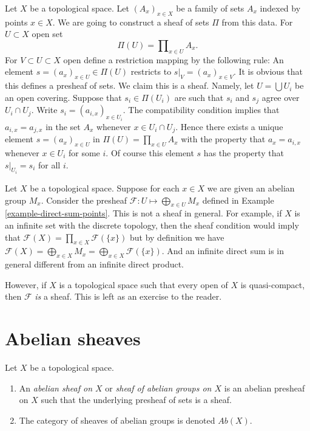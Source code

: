\begin{example}
\label{example-sheaf-product-pointwise}
Let $X$ be a topological space. Let $(A_x)_{x \in X}$ be 
a family of sets $A_x$ indexed by points $x \in X$. We are
going to construct a sheaf of sets $\Pi$ from this data.
For $U \subset X$ open set
$$
\Pi(U) = \prod\nolimits_{x \in U} A_x.
$$
For $V \subset U \subset X$ open define
a restriction mapping by the following rule: An element
$s = (a_x)_{x\in U} \in \Pi(U)$ restricts
to $s|_V = (a_x)_{x \in V}$. It is obvious that this
defines a presheaf of sets. We claim this is a sheaf.
Namely, let $U = \bigcup U_i$ be an open covering.
Suppose that $s_i \in \Pi(U_i)$ are
such that $s_i$ and $s_j$ agree over $U_i \cap U_j$. Write
$s_i = (a_{i,x})_{x\in U_i}$. The compatibility condition implies that
$a_{i, x} = a_{j, x}$ in the set $A_x$ whenever $x \in U_i \cap U_j$. 
Hence there exists a unique element $s = (a_x)_{x\in U}$
in $\Pi(U) = \prod_{x\in U} A_x$ with the property that
$a_x = a_{i, x}$ whenever $x \in U_i$ for some $i$. Of course this
element $s$ has the property that $s|_{U_i} = s_i$ for all $i$.
\end{example}

\begin{example}
\label{example-direct-sum-points-not-sheaf}
Let $X$ be a topological space.
Suppose for each $x\in X$ we are given an abelian group $M_x$.
Consider the presheaf $\mathcal{F} : U \mapsto \bigoplus_{x \in U} M_x$
defined in Example \ref{example-direct-sum-points}. This
is not a sheaf in general. For example, if $X$ is an infinite set
with the discrete topology, then the sheaf condition 
would imply that $\mathcal{F}(X) = \prod_{x\in X} \mathcal{F}(\{x\})$
but by definition we have $\mathcal{F}(X)
= \bigoplus_{x \in X} M_x = \bigoplus_{x \in X} \mathcal{F}(\{x\})$.
And an infinite direct sum is in general different from an infinite
direct product.

\medskip\noindent
However, if $X$ is a topological space such that every open
of $X$ is quasi-compact, then $\mathcal{F}$ {\it is} a sheaf.
This is left as an exercise to the reader.
\end{example}



\section{Abelian sheaves}
\label{section-abelian-sheaves}

\begin{definition}
\label{definition-abelian-sheaf}
Let $X$ be a topological space.
\begin{enumerate}
\item An {\it abelian sheaf on $X$} or
{\it sheaf of abelian groups on $X$}
is an abelian presheaf on $X$ such that the underlying presheaf of
sets is a sheaf.
\item The category of sheaves of abelian groups
is denoted $\textit{Ab}(X)$.
\end{enumerate}
\end{definition}



